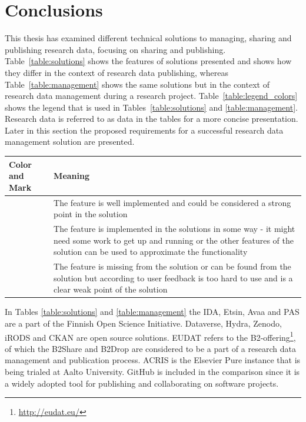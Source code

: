 \chapter{Conclusions}
\label{chapter:conclusions}

This thesis has examined different technical solutions to managing, sharing and
publishing research data, focusing on sharing and publishing.
Table~\ref{table:solutions} shows the features of solutions presented and shows
how they differ in the context of research data publishing, whereas Table~\ref{table:management} shows the same solutions but in the context of research
data management during a research project. Table~\ref{table:legend_colors} shows the legend that is used in
Tables~\ref{table:solutions} and \ref{table:management}. Research data is referred
to as data in the tables for a more concise presentation. Later in this section the
proposed requirements for a successful research data management solution
are presented.

\addtocounter{table}{-1}
\label{table:legend_colors}
    \begin{tabularx}{\textwidth}{| >{\raggedright}p{3cm} | X |}
    \hline
    \textbf{Color and Mark} & \textbf{Meaning} \\
    \hline
    \multicolumn{1}{|c|}{\cellcolor{green}++} & The feature is well implemented and could be considered a strong point
                          in the solution \\
    \hline
    \multicolumn{1}{|c|}{\cellcolor{yellow}+} & The feature is implemented in the solutions in some way - it might need
                          some work to get up and running or the other features of the solution can be used to
                          approximate the functionality \\
    \hline
    \multicolumn{1}{|c|}{\cellcolor{red}-}    & The feature is missing from the solution or can be found from the solution but according
                          to user feedback is too hard to use and is a clear weak point of the solution \\
    \hline
\end{tabularx}

In Tables \ref{table:solutions} and \ref{table:management} the IDA, Etsin, Avaa and PAS are a part of the
Finnish Open Science Initiative. Dataverse, Hydra, Zenodo, iRODS and CKAN are
open source solutions. EUDAT refers to the B2-offering\footnote{\url{http://eudat.eu/}},
of which the B2Share and B2Drop are considered to be a part of a research
data management and publication process. ACRIS is the Elsevier Pure instance
that is being trialed at Aalto University. GitHub is included in the
comparison since it is a widely adopted tool for publishing and collaborating
on software projects.

